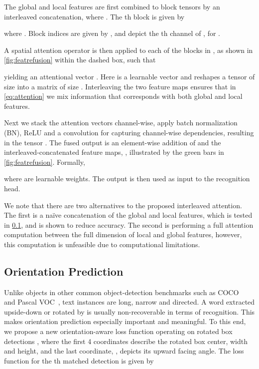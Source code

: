 \documentclass[runningheads]{llncs}
\begin{document}
The global and local features are first combined to  block tensors by an interleaved concatenation, where .
The th block is given by

where .
Block indices are given by , and  depict the th channel of , for .

A spatial attention operator is then applied to each of the  blocks in , as shown in \cref{fig:featrefusion} within the dashed box, such that

yielding an attentional vector .
Here  is a learnable vector and  reshapes a tensor of size  into a matrix of size .
Interleaving the two feature maps ensures that in 
\cref{eq:attention} we mix information that corresponds with both global and local features.

Next we stack the  attention vectors  channel-wise, apply batch normalization (BN), ReLU and a  convolution for capturing channel-wise dependencies, resulting in the tensor . 
The fused output is an element-wise addition of  and the interleaved-concatenated feature maps, ,
illustrated by the green bars in \cref{fig:featrefusion}. Formally, 

where  are learnable weights.
The output  is then used as input to the recognition head.

We note that there are two alternatives to the proposed interleaved attention.
The first is a na\"ive concatenation of the global and local features, which is tested in \cref{sec:detection}, and is shown to reduce accuracy.
The second is performing a full attention computation between the full dimension of local and global features, however, this computation is unfeasible due to computational limitations.


\subsection{Orientation Prediction}
\label{sec:detection}

Unlike objects in other common object-detection benchmarks such as COCO~\cite{mscoco2014} and Pascal VOC~\cite{pascalvoc}, text instances are long, narrow and directed.
A word extracted upside-down or rotated by  is usually non-recoverable in terms of recognition.
This makes orientation prediction especially important and meaningful.
To this end, we propose a new orientation-aware loss function operating on rotated box detections , where the first 4 coordinates describe the rotated box center, width and height, and the last coordinate, , depicts its upward facing angle.
The loss function for the th matched detection is given by
\end{document}

